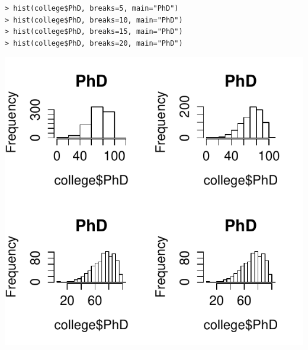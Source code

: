 \documentclass[11pt]{article}
\begin{document}
\begin{enumerate}
\begin{enumerate}
\begin{enumerate}
\begin{lstlisting}
> hist(college$PhD, breaks=5, main="PhD")
> hist(college$PhD, breaks=10, main="PhD")
> hist(college$PhD, breaks=15, main="PhD")
> hist(college$PhD, breaks=20, main="PhD")
\end{lstlisting}
\begin{center}
\includegraphics[scale=.8]{plot5.pdf}
\end{center}


\end{enumerate}
\end{enumerate}
\end{enumerate}
\end{document}
